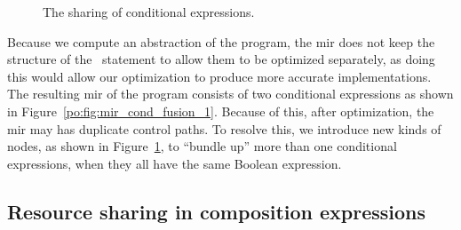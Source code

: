 \begin{figure}[ht]
{\label{po:fig:mir_cond_fusion_2}
    }
    \caption{The sharing of conditional expressions.}
\end{figure}

Because we compute an abstraction of the program, the \gls{mir} does not
keep the structure of the \iflit~statement to allow them to be optimized
separately, as doing this would allow our optimization to produce more accurate
implementations.  The resulting \gls{mir} of the program consists of two
conditional expressions as shown in Figure~\ref{po:fig:mir_cond_fusion_1}.
Because of this, after optimization, the \gls{mir} may has duplicate control
paths.  To resolve this, we introduce new kinds of nodes, as shown in
Figure~\ref{po:fig:mir_cond_fusion_2}, to ``bundle up'' more than one
conditional expressions, when they all have the same Boolean expression.


\subsection{Resource sharing in composition expressions}

